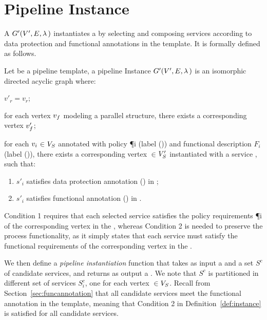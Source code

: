 \section{Pipeline Instance}\label{sec:instance}
A \pipelineInstance $G'(V',E,\lambda\,)$ instantiates a \pipelineTemplate \tChartFunction by selecting and composing services according to data protection and functional annotations in the template. It is formally defined as follows.
\vspace{0.5em}
\begin{definition}\label{def:instance}
  Let \tChartFunction be a pipeline template, a pipeline Instance $G'(V',E,\lambda\,)$ is an isomorphic directed acyclic graph where:
  \begin{enumerate*}[label=\textit{\roman*})]
    \item $v'_r$$=$$v_r$;
    \item for each vertex $v_{f}$ modeling a parallel structure, there exists a corresponding vertex $v'_{f}$;
    \item for each $v_{i}$$\in$$V_S$ annotated with policy \P{i} (label \myLambda()) and functional description $F_i$ (label \myGamma()), there exists a corresponding vertex $\in$$V'_S$ instantiated with a service , such that:
  \end{enumerate*}
  \begin{enumerate}[label=\arabic*)]
    \item $s'_i$ satisfies data protection annotation \myLambda() in \tChartFunction;
    \item $s'_i$ satisfies functional annotation \myGamma() in \tChartFunction.
  \end{enumerate}
\end{definition}

\vspace{0.5em}

Condition 1 requires that each selected service  satisfies the policy requirements \P{i} of the corresponding vertex  in the \pipelineTemplate, whereas Condition 2 is needed to preserve the process functionality, as it simply states that each service  must satisfy the functional requirements  of the corresponding vertex  in the \pipelineTemplate.

We then define a \emph{pipeline instantiation} function that takes as input a \pipelineTemplate \tChartFunction and a set $S^c$ of candidate services, and returns as output a \pipelineInstance \iChartFunction. We note that $S^c$ is partitioned in different set of services $S^c_{i}$, one for each vertex $\in$$V_S$. Recall from Section~\ref{sec:funcannotation} that all candidate services meet the functional annotation in the template, meaning that Condition 2 in Definition~\ref{def:instance} is satisfied for all candidate services.

